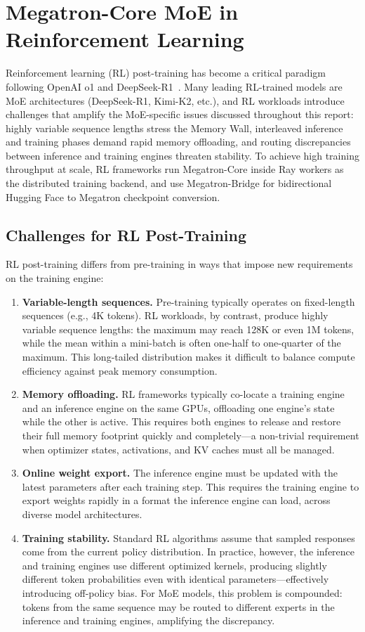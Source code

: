 \section{Megatron-Core MoE in Reinforcement Learning}\label{sec:rl}
Reinforcement learning (RL) post-training has become a critical paradigm following OpenAI o1 and DeepSeek-R1~\cite{deepseekai2025deepseekr1}. Many leading RL-trained models are MoE architectures (DeepSeek-R1, Kimi-K2, etc.), and RL workloads introduce challenges that amplify the MoE-specific issues discussed throughout this report: highly variable sequence lengths stress the Memory Wall, interleaved inference and training phases demand rapid memory offloading, and routing discrepancies between inference and training engines threaten stability. To achieve high training throughput at scale, RL frameworks run Megatron-Core inside Ray workers as the distributed training backend, and use Megatron-Bridge for bidirectional Hugging Face to Megatron checkpoint conversion.

\subsection{Challenges for RL Post-Training}
RL post-training differs from pre-training in ways that impose new requirements on the training engine:

\begin{enumerate}
    \item \textbf{Variable-length sequences.} Pre-training typically operates on fixed-length sequences (e.g., 4K tokens). RL workloads, by contrast, produce highly variable sequence lengths: the maximum may reach 128K or even 1M tokens, while the mean within a mini-batch is often one-half to one-quarter of the maximum. This long-tailed distribution makes it difficult to balance compute efficiency against peak memory consumption.
    \item \textbf{Memory offloading.} RL frameworks typically co-locate a training engine and an inference engine on the same GPUs, offloading one engine's state while the other is active. This requires both engines to release and restore their full memory footprint quickly and completely---a non-trivial requirement when optimizer states, activations, and KV caches must all be managed.
    \item \textbf{Online weight export.} The inference engine must be updated with the latest parameters after each training step. This requires the training engine to export weights rapidly in a format the inference engine can load, across diverse model architectures.
    \item \textbf{Training stability.} Standard RL algorithms assume that sampled responses come from the current policy distribution. In practice, however, the inference and training engines use different optimized kernels, producing slightly different token probabilities even with identical parameters---effectively introducing off-policy bias. For MoE models, this problem is compounded: tokens from the same sequence may be routed to different experts in the inference and training engines, amplifying the discrepancy.
\end{enumerate}
